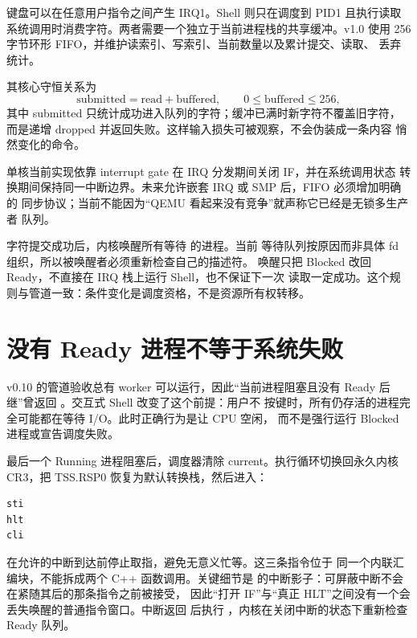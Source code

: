 键盘可以在任意用户指令之间产生 IRQ1。Shell 则只在调度到 PID1 且执行读取
系统调用时消费字符。两者需要一个独立于当前进程栈的共享缓冲。v1.0 使用
256 字节环形 FIFO，并维护读索引、写索引、当前数量以及累计提交、读取、
丢弃统计。

其核心守恒关系为
\[
  \mathrm{submitted}
  =
  \mathrm{read}
  + \mathrm{buffered},
  \qquad
  0\le \mathrm{buffered}\le256,
\]
其中 submitted 只统计成功进入队列的字符；缓冲已满时新字符不覆盖旧字符，
而是递增 dropped 并返回失败。这样输入损失可被观察，不会伪装成一条内容
悄然变化的命令。

单核当前实现依靠 interrupt gate 在 IRQ 分发期间关闭 IF，并在系统调用状态
转换期间保持同一中断边界。未来允许嵌套 IRQ 或 SMP 后，FIFO 必须增加明确的
同步协议；当前不能因为“QEMU 看起来没有竞争”就声称它已经是无锁多生产者
队列。

字符提交成功后，内核唤醒所有等待  的进程。当前
等待队列按原因而非具体 fd 组织，所以被唤醒者必须重新检查自己的描述符。
唤醒只把 Blocked 改回 Ready，不直接在 IRQ 栈上运行 Shell，也不保证下一次
读取一定成功。这个规则与管道一致：条件变化是调度资格，不是资源所有权转移。

\section{没有 Ready 进程不等于系统失败}

v0.10 的管道验收总有 worker 可以运行，因此“当前进程阻塞且没有 Ready
后继”曾返回 。交互式 Shell 改变了这个前提：用户不
按键时，所有仍存活的进程完全可能都在等待 I/O。此时正确行为是让 CPU 空闲，
而不是强行运行 Blocked 进程或宣告调度失败。

最后一个 Running 进程阻塞后，调度器清除 current。执行循环切换回永久内核
CR3，把 TSS.RSP0 恢复为默认转换栈，然后进入：

\begin{lstlisting}[language={[x86masm]Assembler}]
sti
hlt
cli
\end{lstlisting}

 在允许的中断到达前停止取指，避免无意义忙等。这三条指令位于
同一个内联汇编块，不能拆成两个 C++ 函数调用。关键细节是
 的中断影子：可屏蔽中断不会在紧随其后的那条指令之前被接受，
因此“打开 IF”与“真正 HLT”之间没有一个会丢失唤醒的普通指令窗口。中断返回
后执行 ，内核在关闭中断的状态下重新检查 Ready 队列。

